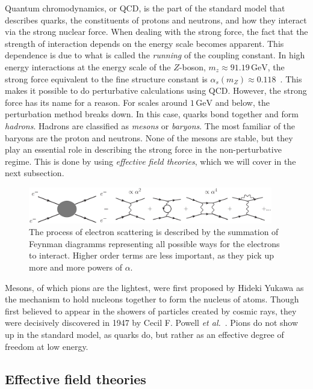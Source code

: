 Quantum chromodynamics, or QCD, is the part of the standard model that describes quarks, the constituents of protons and neutrons, and how they interact via the strong nuclear force.
When dealing with the strong force, the fact that the strength of interaction depends on the energy scale becomes apparent.
This dependence is due to what is called the \emph{running} of the coupling constant.
In high energy interactions at the energy scale of the $Z$-boson, $m_z \approx 91.19 \, \text{GeV}$, the strong force equivalent to the fine structure constant is $\alpha_s(m_Z) \approx 0.118$~\cite{PDG}. 
This makes it possible to do perturbative calculations using QCD.
However, the strong force has its name for a reason.
For scales around $1\, \text{GeV}$ and below, the perturbation method breaks down.
In this case, quarks bond together and form \emph{hadrons}.
Hadrons are classified as \emph{mesons} or \emph{baryons}.
The most familiar of the baryons are the proton and neutrons.
None of the mesons are stable, but they play an essential role in describing the strong force in the non-perturbative regime.
This is done by using \emph{effective field theories}, which we will cover in the next subsection.

\begin{figure}[h]
    \centering
    \includegraphics[width=0.95\textwidth]{figurer/feynman-diagram/sum_qed.eps}
    \caption{The process of electron scattering is described by the summation of Feynman diagramms representing all possible ways for the electrons to interact. Higher order terms are less important, as they pick up more and more powers of $\alpha$.}
    \label{fig:qed feynman diagrams}
\end{figure}

Mesons, of which pions are the lightest, were first proposed by Hideki Yukawa as the mechanism to hold nucleons together to form the nucleus of atoms.
Though first believed to appear in the showers of particles created by cosmic rays, they were decisively discovered in 1947 by Cecil F. Powell \emph{et al.}~\cite{griffiths:introduction}.
Pions do not show up in the standard model, as quarks do, but rather as an effective degree of freedom at low energy.


\subsection*{Effective field theories}

